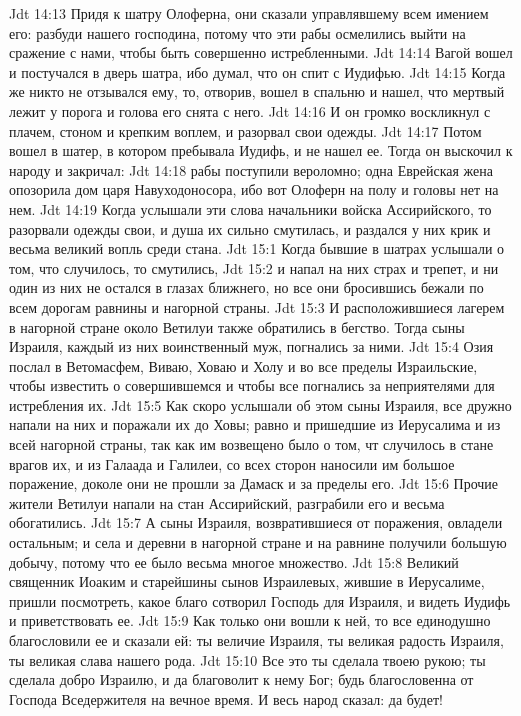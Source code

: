 \vs Jdt 14:13 Придя к шатру Олоферна, они сказали управлявшему всем имением его: разбуди нашего господина, потому что эти рабы осмелились выйти на сражение с нами, чтобы быть совершенно истребленными.
\vs Jdt 14:14 Вагой вошел и постучался в дверь шатра, ибо думал, что он спит с Иудифью.
\vs Jdt 14:15 Когда же никто не отзывался ему, то, отворив, вошел в спальню и нашел, что  мертвый лежит у порога и голова его снята с него.
\vs Jdt 14:16 И он громко воскликнул с плачем, стоном и крепким воплем, и разорвал свои одежды.
\vs Jdt 14:17 Потом вошел в шатер, в котором пребывала Иудифь, и не нашел ее. Тогда он выскочил к народу и закричал:
\vs Jdt 14:18 рабы поступили вероломно; одна Еврейская жена опозорила дом царя Навуходоносора, ибо вот Олоферн на полу и головы нет на нем.
\vs Jdt 14:19 Когда услышали эти слова начальники войска Ассирийского, то разорвали одежды свои, и душа их сильно смутилась, и раздался у них крик и весьма великий вопль среди стана.
\vs Jdt 15:1 Когда бывшие в шатрах услышали о том, что случилось, то смутились,
\vs Jdt 15:2 и напал на них страх и трепет, и ни один из них не остался в глазах ближнего, но все они бросившись бежали по всем дорогам равнины и нагорной страны.
\vs Jdt 15:3 И расположившиеся лагерем в нагорной стране около Ветилуи также обратились в бегство. Тогда сыны Израиля, каждый из них воинственный муж, погнались за ними.
\vs Jdt 15:4 Озия послал в Ветомасфем, Виваю, Ховаю и Холу и во все пределы Израильские, чтобы известить о совершившемся и чтобы все погнались за неприятелями для истребления их.
\vs Jdt 15:5 Как скоро услышали об этом сыны Израиля, все дружно напали на них и поражали их до Ховы; равно и пришедшие из Иерусалима и из всей нагорной страны, так как им возвещено было о том, чт случилось в стане врагов их, и из Галаада и Галилеи, со всех сторон наносили им большое поражение, доколе они не прошли за Дамаск и за пределы его.
\vs Jdt 15:6 Прочие жители Ветилуи напали на стан Ассирийский, разграбили его и весьма обогатились.
\vs Jdt 15:7 А сыны Израиля, возвратившиеся от поражения, овладели остальным; и села и деревни в нагорной стране и на равнине получили большую добычу, потому что ее было весьма многое множество.
\vs Jdt 15:8 Великий священник Иоаким и старейшины сынов Израилевых, жившие в Иерусалиме, пришли посмотреть, какое благо сотворил Господь для Израиля, и видеть Иудифь и приветствовать ее.
\vs Jdt 15:9 Как только они вошли к ней, то все единодушно благословили ее и сказали ей: ты величие Израиля, ты великая радость Израиля, ты великая слава нашего рода.
\vs Jdt 15:10 Все это ты сделала твоею рукою; ты сделала добро Израилю, и да благоволит к нему Бог; будь  благословенна от Господа Вседержителя на вечное время. И весь народ сказал: да будет!
